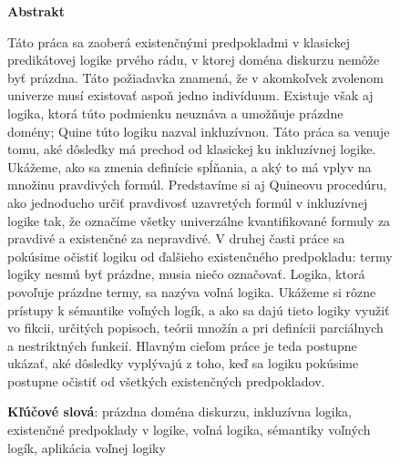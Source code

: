 \documentclass[12pt, letterpaper]{article}
\begin{document}
	\begin{figure}[p] %
	    \centering
	    
	    \begin{minipage}[t][0.4\textheight][t]{\textwidth}
	        \begin{center} \textbf{Abstrakt} \end{center} \par
	        Táto práca sa zaoberá existenčnými predpokladmi v klasickej predikátovej logike prvého rádu, v ktorej doména diskurzu nemôže byť prázdna.
Táto požiadavka znamená, že v akomkoľvek zvolenom univerze musí existovať aspoň jedno indivíduum. Existuje však aj logika, ktorá túto podmienku neuznáva a umožňuje prázdne domény; Quine túto logiku nazval inkluzívnou. Táto práca sa venuje tomu, aké dôsledky má prechod od klasickej ku inkluzívnej logike. Ukážeme, ako sa zmenia definície spĺňania, a aký to má vplyv na množinu pravdivých formúl. Predstavíme si aj Quineovu procedúru, ako jednoducho určiť pravdivosť uzavretých formúl v inkluzívnej logike tak, že označíme všetky univerzálne kvantifikované formuly za pravdivé a existenčné za nepravdivé. V druhej časti práce sa pokúsime očistiť logiku od ďalšieho existenčného predpokladu: termy logiky nesmú byť prázdne, musia niečo označovať. Logika, ktorá povoľuje prázdne termy, sa nazýva voľná logika. Ukážeme si rôzne prístupy k sémantike voľných logík, a ako sa dajú tieto logiky využiť vo fikcii, určitých popisoch, teórii množín a pri definícii parciálnych a nestriktných funkcií.
Hlavným cieľom práce je teda postupne ukázať, aké dôsledky vyplývajú z toho, keď sa logiku pokúsime postupne očistiť od všetkých existenčných predpokladov.
	       
	    \end{minipage}
	    \begin{minipage}[t][0.1\textheight][t]{\textwidth}
	        \textbf{Kľúčové slová}: prázdna doména diskurzu, inkluzívna logika, existenčné predpoklady v logike, voľná logika, sémantiky voľných logík, aplikácia voľnej logiky
	    \end{minipage}
	    
	    \vspace{0.005\textheight} %
	    

\end{figure}
\end{document}
